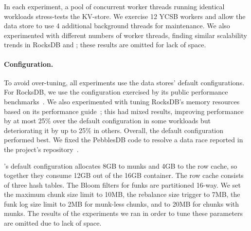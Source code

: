 In each experiment, a pool of concurrent worker threads running identical
workloads stress-tests the KV-store. We exercise 12 YCSB workers 
and allow the data store to use 4 additional background threads for maintenance.
We also experimented with different numbers of worker threads, finding similar scalability trends in RocksDB and 
\sys; these results are omitted for lack of space.







\paragraph{Configuration.} 
To avoid over-tuning, all experiments use the data stores' default configurations. For RocksDB, we use the configuration exercised by its public 
performance benchmarks~\cite{RocksDBPerf}. 
We also experimented with tuning RocksDB's memory resources based on its performance guide~\cite{RocksDBMemoryTuning}; 
this had mixed results, improving performance by at most 25\% over the default configuration in some workloads but 
deteriorating it by up to 25\% in others. Overall, the default configuration performed best. 
We fixed the PebblesDB code to resolve a data race reported in the project's repository~\cite{pebbles-git-issue}. 

\sys's default configuration 
allocates 8GB to munks and 4GB to the row cache,
so together they consume 12GB out of the 16GB container. 
The row cache consists of three hash tables.  
The Bloom filters for funks are partitioned 16-way.  
We set the \sys\/ maximum chunk size limit to 10MB, the rebalance size trigger to 7MB, 
the funk log size limit to 2MB for munk-less chunks, and to 20MB for chunks with munks. 
The results of the experiments we ran in order to tune these parameters are omitted due to lack of space.

